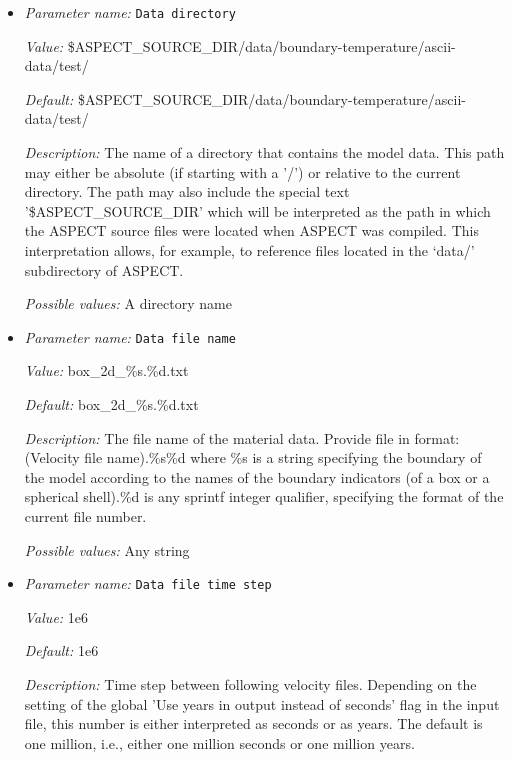 \begin{itemize}
\item {\it Parameter name:} {\tt Data directory}
\label{parameters:Boundary temperature model/Ascii data model/Data directory}


{\it Value:} \$ASPECT\_SOURCE\_DIR/data/boundary-temperature/ascii-data/test/


{\it Default:} \$ASPECT\_SOURCE\_DIR/data/boundary-temperature/ascii-data/test/


{\it Description:} The name of a directory that contains the model data. This path may either be absolute (if starting with a '/') or relative to the current directory. The path may also include the special text '\$ASPECT\_SOURCE\_DIR' which will be interpreted as the path in which the ASPECT source files were located when ASPECT was compiled. This interpretation allows, for example, to reference files located in the `data/' subdirectory of ASPECT. 


{\it Possible values:} A directory name
\item {\it Parameter name:} {\tt Data file name}
\label{parameters:Boundary temperature model/Ascii data model/Data file name}


{\it Value:} box\_2d\_\%s.\%d.txt


{\it Default:} box\_2d\_\%s.\%d.txt


{\it Description:} The file name of the material data. Provide file in format: (Velocity file name).\%s\%d where \%s is a string specifying the boundary of the model according to the names of the boundary indicators (of a box or a spherical shell).\%d is any sprintf integer qualifier, specifying the format of the current file number. 


{\it Possible values:} Any string
\item {\it Parameter name:} {\tt Data file time step}
\label{parameters:Boundary temperature model/Ascii data model/Data file time step}


{\it Value:} 1e6


{\it Default:} 1e6


{\it Description:} Time step between following velocity files. Depending on the setting of the global 'Use years in output instead of seconds' flag in the input file, this number is either interpreted as seconds or as years. The default is one million, i.e., either one million seconds or one million years.



\end{itemize}
